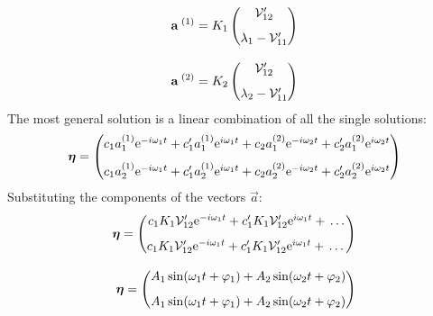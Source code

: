 \begin{equation}
    \begin{split}
        \vb{a}^{\;(1)} = K_1\begin{pmatrix}
            \mathcal{V}'_{12} \\[8pt] \lambda_1 - \mathcal{V}'_{11}
        \end{pmatrix}\\[8pt]
        \vb{a}^{\;(2)} = K_2\begin{pmatrix}
            \mathcal{V}'_{12} \\[8pt] \lambda_2 - \mathcal{V}'_{11}
        \end{pmatrix}
    \end{split}
\end{equation}
The most general solution is a linear combination of all the single solutions:
\begin{equation}
    \boldsymbol{\eta} = \begin{pmatrix}
        c_1 a_1^{(1)}\mathrm{e}^{-i\omega_1 t} + c_1' a_1^{(1)}\mathrm{e}^{i\omega_1 t} + c_2 a_1^{(2)}\mathrm{e}^{-i\omega_2 t} + c_2' a_1^{(2)}\mathrm{e}^{i\omega_2 t}\\[8pt]
        c_1 a_2^{(1)}\mathrm{e}^{-i\omega_1 t} + c_1' a_2^{(1)}\mathrm{e}^{i\omega_1 t} + c_2 a_2^{(2)}\mathrm{e}^{-i\omega_2 t} + c_2' a_2^{(2)}\mathrm{e}^{i\omega_2 t}
    \end{pmatrix}
\end{equation}
Substituting the components of the vectors $\vec{a}$:
\begin{equation}
    \begin{split}
        \boldsymbol{\eta} = \begin{pmatrix}
            c_1 K_1\mathcal{V}'_{12}\mathrm{e}^{-i\omega_1 t} + c_1' K_1\mathcal{V}'_{12}\mathrm{e}^{i\omega_1 t} +  \,\dots\, \\[8pt]
            c_1 K_1\mathcal{V}'_{12}\mathrm{e}^{-i\omega_1 t} + c_1' K_1\mathcal{V}'_{12}\mathrm{e}^{i\omega_1 t} +  \,\dots\,
        \end{pmatrix}\\[8pt]
        \boldsymbol{\eta} = \begin{pmatrix}
            A_1 \sin(\omega_1 t + \varphi_1) + A_2 \sin(\omega_2 t + \varphi_2)\\[8pt]
            A_1 \sin(\omega_1 t + \varphi_1) + A_2 \sin(\omega_2 t + \varphi_2)
        \end{pmatrix}
    \end{split}
\end{equation}
